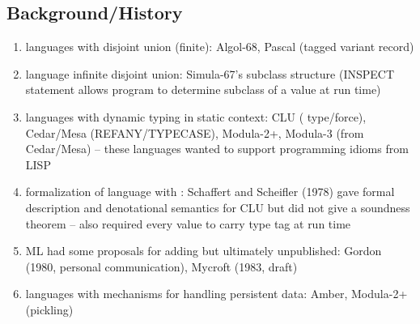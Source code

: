 \documentclass[12pt]{article}	%
\begin{document}
\subsection*{Background/History}
\begin{enumerate}
	\item languages with disjoint union (finite): Algol-68, Pascal (tagged variant record)
	\item language infinite disjoint union: Simula-67's subclass structure (INSPECT statement allows program to determine subclass of a value at run time)
	\item languages with dynamic typing in static context: CLU ( type/force), Cedar/Mesa (REFANY/TYPECASE), Modula-2+, Modula-3 (from Cedar/Mesa) -- these languages wanted to support programming idioms from LISP
	\item formalization of language with \Dynamic: Schaffert and Scheifler (1978) gave formal description and denotational semantics for CLU but did not give a soundness theorem -- also required every value to carry type tag at run time
	\item ML had some proposals for adding \Dynamic but ultimately unpublished: Gordon (1980, personal communication), Mycroft (1983, draft)
	\item languages with mechanisms for handling persistent data: Amber, Modula-2+ (pickling)
\end{enumerate}
\end{document}
